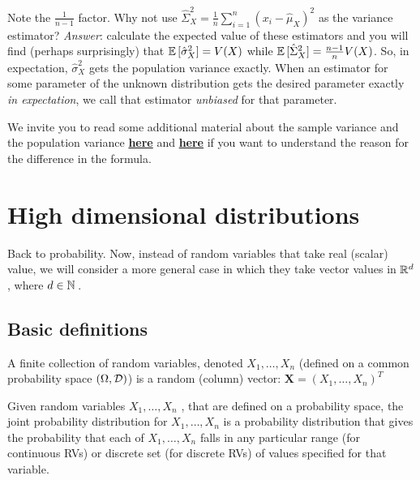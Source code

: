 {Note the $\frac{1}{n-1}$ factor. Why not use $\hat{\Sigma}_X^2 = \frac{1}{n} \sum_{i=1}^n (x_i-\hat{\mu}_X)^2$ as the variance estimator? \emph{Answer}: calculate the expected value of these estimators and you will find (perhaps surprisingly) that $\mathbb{E}\,[\hat{\sigma}_X^2]=V(X)$ while $\mathbb{E}\,[\hat{\Sigma}_X^2] = \frac{n-1}{n}V(X)$. So, in expectation, $\hat{\sigma}_X^2$ gets the population variance exactly. When an estimator for some parameter of the unknown distribution gets the desired parameter exactly {\em in expectation}, we call that estimator {\em unbiased} for that parameter. 


We invite you to read some additional material about the sample variance and the population variance {\color{blue}\href{https://www.macroption.com/population-sample-variance-standard-deviation/}{\textbf{here}}}  and {\color{blue}\href{https://en.wikipedia.org/wiki/Bias_of_an_estimator}{\textbf{here}}} if you want to understand the reason for the difference in the formula. \\

\section{High dimensional distributions}
Back to probability. Now, instead of random variables that take real (scalar) value,  we will consider a more general case in which they take vector values in $\mathbb{R}^d$, where $d\in \mathbb{N}\,$.

\subsection{Basic definitions}

\begin{definition}
A finite collection of random variables, denoted $X_1, \dots, X_n$ (defined on a common probability space $(\Omega, \mathcal{D})$) is a random (column) vector: $\boldsymbol{X} = (X_1, \dots, X_n)^T$

\end{definition}


\begin{definition}
Given random variables $X_1, \dots, X_n$ , that are defined on a probability space, the joint probability distribution for $X_1, \dots, X_n$ is a probability distribution that gives the probability that each of $X_1, \dots, X_n$ falls in any particular range (for continuous RVs) or discrete set (for discrete RVs) of values specified for that variable.


\end{definition}}
